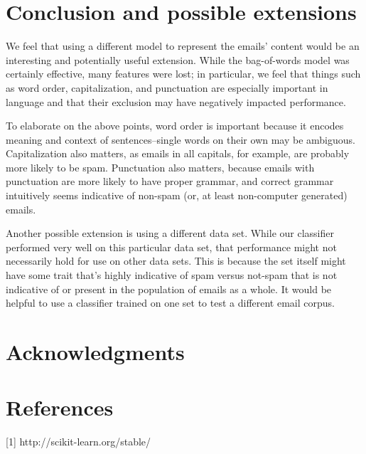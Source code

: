 \documentclass{article} %
\begin{document}
\section{Conclusion and possible extensions}

We feel that using a different model to represent the emails' content would be an interesting and potentially useful extension. While the bag-of-words model was certainly effective, many features were lost; in particular, we feel that things such as word order, capitalization, and punctuation are especially important in language and that their exclusion may have negatively impacted performance. 

To elaborate on the above points, word order is important because it encodes meaning and context of sentences--single words on their own may be ambiguous. Capitalization also matters, as emails in all capitals, for example, are probably more likely to be spam. Punctuation also matters, because emails with punctuation are more likely to have proper grammar, and correct grammar intuitively seems indicative of non-spam (or, at least non-computer generated) emails. 

Another possible extension is using a different data set. While our classifier performed very well on this particular data set, that performance might not necessarily hold for use on other data sets. This is because the set itself might have some trait that's highly indicative of spam versus not-spam that is not indicative of or present in the population of emails as a whole. It would be helpful to use a classifier trained on one set to test a different email corpus. 

\section{Acknowledgments}

\section{References}

[1] http://scikit-learn.org/stable/
\end{document}

